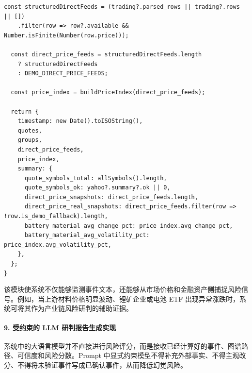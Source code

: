\documentclass[12pt,a4paper]{article}
\begin{document}
\begin{lstlisting}[style=projectcode,caption={市场价格代理指标与材料价格指数构建}]
  const structuredDirectFeeds = (trading?.parsed_rows || trading?.rows || [])
    .filter(row => row?.available && Number.isFinite(Number(row.price)));

  const direct_price_feeds = structuredDirectFeeds.length
    ? structuredDirectFeeds
    : DEMO_DIRECT_PRICE_FEEDS;

  const price_index = buildPriceIndex(direct_price_feeds);

  return {
    timestamp: new Date().toISOString(),
    quotes,
    groups,
    direct_price_feeds,
    price_index,
    summary: {
      quote_symbols_total: allSymbols().length,
      quote_symbols_ok: yahoo?.summary?.ok || 0,
      direct_price_snapshots: direct_price_feeds.length,
      direct_price_real_snapshots: direct_price_feeds.filter(row => !row.is_demo_fallback).length,
      battery_material_avg_change_pct: price_index.avg_change_pct,
      battery_material_avg_volatility_pct: price_index.avg_volatility_pct,
    },
  };
}
\end{lstlisting}

该模块使系统不仅能够监测事件文本，还能够从市场价格和金融资产侧捕捉风险信号。例如，当上游材料价格明显波动、锂矿企业或电池 ETF 出现异常涨跌时，系统可将其作为产业链风险研判的辅助证据。

\paragraph{9. 受约束的 LLM 研判报告生成实现}

系统中的大语言模型并不直接进行风险评分，而是接收已经计算好的事件、图谱路径、可信度和风险分数。Prompt 中显式约束模型不得补充外部事实、不得主观改分、不得将未验证事件写成已确认事件，从而降低幻觉风险。
\end{document}
